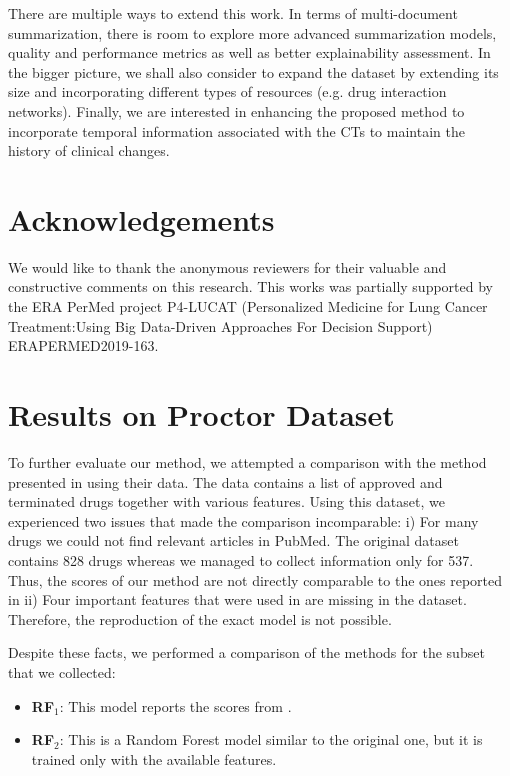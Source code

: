 \documentclass[11pt]{article}
\begin{document}
There are multiple ways to extend this work. In terms of multi-document summarization, there is room to explore more advanced summarization models, quality and performance metrics as well as better explainability assessment. In the bigger picture, we shall also consider to expand the dataset by extending its size and incorporating different types of resources (e.g. drug interaction networks). Finally, we are interested in enhancing the proposed method to incorporate temporal information associated with the CTs to maintain the history of clinical changes.

\section*{Acknowledgements}
We would like to thank the anonymous reviewers for their valuable and constructive comments on this research.
This works was partially supported by the ERA PerMed project P4-LUCAT (Personalized Medicine for Lung Cancer Treatment:Using Big Data-Driven Approaches For Decision Support) ERAPERMED2019-163. 




\newpage
\appendix

\section{Results on Proctor Dataset}
\label{sec:appendix}
To further evaluate our method, we attempted a comparison with the method presented in \cite{gayvert2016data} using their data. The data contains a list of approved and terminated drugs together with various features. Using this dataset, we experienced two issues that made the comparison incomparable: i) For many drugs we could not find relevant articles in PubMed. The original dataset contains 828 drugs whereas we managed to collect information only for 537. Thus, the scores of our method are not directly comparable to the ones reported in \cite{gayvert2016data} ii) Four important features that were used in \cite{gayvert2016data} are missing in the dataset. Therefore, the reproduction of the exact model is not possible.

Despite these facts, we performed a comparison of the methods for the subset that we collected:

\begin{itemize}
    \item \textbf{RF$_{1}$}: This model reports the scores from \cite{gayvert2016data}.
    \item \textbf{RF$_{2}$}: This is a Random Forest model similar to the original one, but it is trained only with the available features.

\end{itemize}
\end{document}
